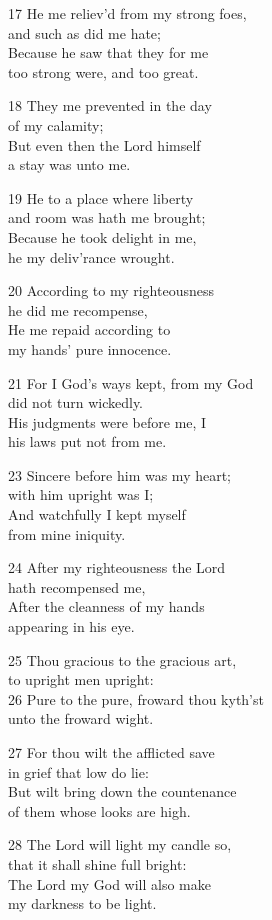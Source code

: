 17 He me reliev’d from my strong foes,\\
and such as did me hate;\\
Because he saw that they for me\\
too strong were, and too great.

18 They me prevented in the day\\
of my calamity;\\
But even then the Lord himself\\
a stay was unto me.

19 He to a place where liberty\\
and room was hath me brought;\\
Because he took delight in me,\\
he my deliv’rance wrought.

20 According to my righteousness\\
he did me recompense,\\
He me repaid according to\\
my hands’ pure innocence.

21 For I God’s ways kept, from my God\\
did not turn wickedly.\\
His judgments were before me, I\\
his laws put not from me.

23 Sincere before him was my heart;\\
with him upright was I;\\
And watchfully I kept myself\\
from mine iniquity.

24 After my righteousness the Lord\\
hath recompensed me,\\
After the cleanness of my hands\\
appearing in his eye.

25 Thou gracious to the gracious art,\\
to upright men upright:\\
26 Pure to the pure, froward thou kyth’st\\
unto the froward wight.

27 For thou wilt the afflicted save\\
in grief that low do lie:\\
But wilt bring down the countenance\\
of them whose looks are high.

28 The Lord will light my candle so,\\
that it shall shine full bright:\\
The Lord my God will also make\\
my darkness to be light.

